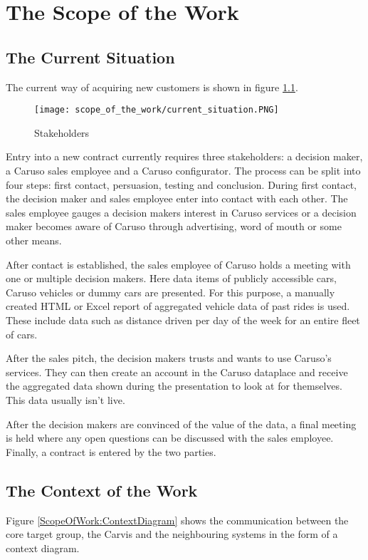 \chapter{The Scope of the Work}
\section{The Current Situation}
The current way of acquiring new customers is shown in figure \ref{ScopeOfWork:Situation}.
\begin{figure}[ht]
  \centering
  \texttt{[image: scope\_of\_the\_work/current\_situation.PNG]}
  \caption{Stakeholders}
  \label{ScopeOfWork:Situation}
\end{figure}

Entry into a new contract currently requires three stakeholders: a decision maker, a Caruso sales employee and a Caruso configurator. The process can be split into four steps: first contact, persuasion, testing and conclusion. During first contact, the decision maker and sales employee enter into contact with each other. The sales employee gauges a decision makers interest in Caruso services or a decision maker becomes aware of Caruso through advertising, word of mouth or some other means.

After contact is established, the sales employee of Caruso holds a meeting with one or multiple decision makers. Here data items of publicly accessible cars, Caruso vehicles or dummy cars are presented. For this purpose, a manually created HTML or Excel report of aggregated vehicle data of past rides is used. These include data such as distance driven per day of the week for an entire fleet of cars.

After the sales pitch, the decision makers trusts and wants to use Caruso's services. They can then create an account in the Caruso dataplace and receive the aggregated data shown during the presentation to look at for themselves. This data usually isn't live.

After the decision makers are convinced of the value of the data, a final meeting is held where any open questions can be discussed with the sales employee. Finally, a contract is entered by the two parties.

\section{The Context of the Work}
Figure \ref*{ScopeOfWork:ContextDiagram} shows the communication between the core target group, the Carvis and the neighbouring systems in the form of a context diagram.

